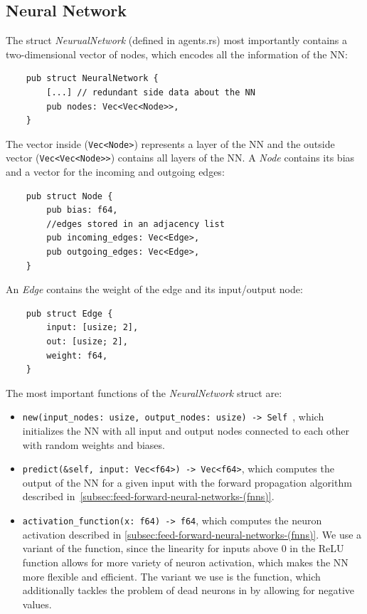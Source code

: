\documentclass[11pt]{report}
\begin{document}
\begin{enumerate}
            \subsection{Neural Network}\label{subsec:neural-network}
    The struct \textit{NeurualNetwork} (defined in agents.rs) most importantly contains a two-dimensional vector of nodes, which encodes all the information of the NN\@:
    \begin{verbatim}
    pub struct NeuralNetwork {
        [...] // redundant side data about the NN
        pub nodes: Vec<Vec<Node>>,
    }
    \end{verbatim}
    The vector inside (\texttt{Vec<Node>}) represents a layer of the NN and the outside vector (\texttt{Vec<Vec<Node>>}) contains all layers of the NN\@.
    A \textit{Node} contains its bias and a vector for the incoming and outgoing edges:
    \begin{verbatim}
    pub struct Node {
        pub bias: f64,
        //edges stored in an adjacency list
        pub incoming_edges: Vec<Edge>,
        pub outgoing_edges: Vec<Edge>,
    }
    \end{verbatim}
    An \textit{Edge} contains the weight of the edge and its input/output node:
    \begin{verbatim}
    pub struct Edge {
        input: [usize; 2],
        out: [usize; 2],
        weight: f64,
    }
    \end{verbatim}
    The most important functions of the \textit{NeuralNetwork} struct are:
    \begin{itemize}
        \item \texttt{new(input_nodes: usize, output_nodes: usize) -> Self {}}, which initializes the NN with all input and output nodes connected to each other with random weights and biases.
        \item \texttt{predict(&self, input: Vec<f64>) -> Vec<f64>}, which computes the output of the NN for a given input with the forward propagation algorithm described in~\ref{subsec:feed-forward-neural-networks-(fnns)}.
        \item \texttt{activation_function(x: f64) -> f64}, which computes the neuron activation described in \ref{subsec:feed-forward-neural-networks-(fnns)}.
        We use a variant of the  function, since the linearity for inputs above 0 in the ReLU function allows for more variety of neuron activation, which makes the NN more flexible and efficient.
        The variant we use is the  function, which additionally tackles the problem of dead neurons in  by allowing for negative values.
    \end{itemize}

\end{enumerate}
\end{document}
